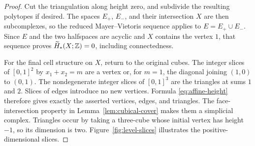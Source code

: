 \begin{proof}
Cut the triangulation along height zero, and subdivide the resulting
polytopes if desired.  The spaces $E_+$, $E_-$, and their intersection
$X$ are then subcomplexes, so the reduced Mayer--Vietoris sequence
applies to $E=E_+\cup E_-$.  Since $E$ and the two halfspaces are
acyclic and $X$ contains the vertex $1$, that sequence proves
$\widetilde H_*(X;\mathbb Z)=0$, including connectedness.

For the final cell structure on $X$, return to the original cubes.
The integer slices of $[0,1]^2$ by $x_1+x_2=m$ are a vertex or,
for $m=1$, the diagonal joining $(1,0)$ to $(0,1)$.  The nondegenerate
integer slices of $[0,1]^3$ are the triangles at sums $1$ and $2$.
Slices of edges introduce no new vertices.  Formula
\eqref{eq:affine-height} therefore gives exactly the asserted
vertices, edges, and triangles.  The face-intersection property in
Lemma~\ref{lem:cubical-cover} makes them a simplicial complex.
Triangles occur by taking a three-cube whose initial vertex has
height $-1$, so its dimension is two.  Figure~\ref{fig:level-slices}
illustrates the positive-dimensional slices.
\end{proof}


